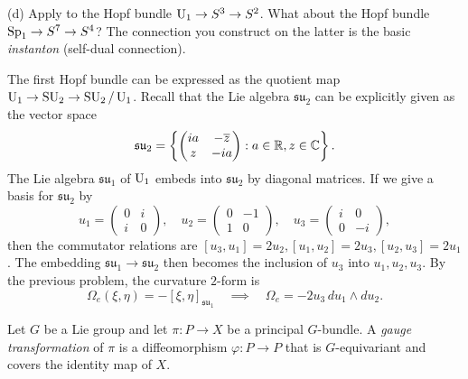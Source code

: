 \documentclass{../../templates/lkx_pset}
\begin{document}
\begin{parts}
  \begin{part}{(d)}
    Apply to the Hopf bundle $\operatorname{U}_1 \to S^3 \to S^2$. What about the Hopf bundle $\operatorname{Sp}_1 \to S^7 \to S^4$? The connection you construct on the latter is the basic \emph{instanton} (self-dual connection).
  \end{part}

  The first Hopf bundle can be expressed as the quotient map $\operatorname{U}_1 \to \operatorname{SU}_2 \to \operatorname{SU}_2/\operatorname{U}_1$. Recall that the Lie algebra $\mathfrak{su}_2$ can be explicitly given as the vector space
  \[
    \mathfrak{su}_2 = \left\{ \begin{pmatrix}ia & -\overline{z}\\ z & -ia\end{pmatrix} : a\in \mathbb{R}, z \in \mathbb{C}\right\}.
  \]
  The Lie algebra $\mathfrak{su}_1$ of $\operatorname{U}_1$ embeds into $\mathfrak{su}_2$ by diagonal matrices. If we give a basis for $\mathfrak{su}_2$ by
  \[
    u_1 = \begin{pmatrix}0&i\\i&0\end{pmatrix},\quad
    u_2 = \begin{pmatrix}0&-1\\1&0\end{pmatrix},\quad
    u_3 = \begin{pmatrix}i&0\\0&-i\end{pmatrix},
  \]
  then the commutator relations are $[u_3, u_1]=2u_2, [u_1, u_2]=2u_3, [u_2,u_3]=2u_1$. The embedding $\mathfrak{su}_1 \to \mathfrak{su}_2$ then becomes the inclusion of $u_3$ into $u_1,u_2,u_3$. By the previous problem, the curvature $2$-form is
  \[
      \Omega_e(\xi, \eta) = -[\xi, \eta]_{\mathfrak{su}_1} \quad\implies\quad \Omega_e = -2u_3\,du_1\wedge du_2.
  \]
\end{parts}

\begin{problem}{7}
  Let $G$ be a Lie group and let $\pi : P \to X$ be a principal $G$-bundle. A \emph{gauge transformation} of $\pi$ is a diffeomorphism $\varphi : P \to P$ that is $G$-equivariant and covers the identity map of $X$.
\end{problem}
\end{document}
